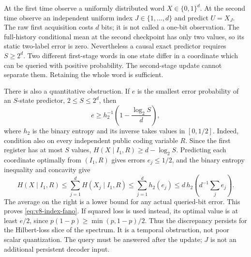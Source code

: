 \begin{example}\label{ex:v8-index}
At the first time observe a uniformly distributed word
$X\in\{0,1\}^d$. At the second time observe an independent uniform index
$J\in\{1,\ldots,d\}$ and predict $U=X_J$. The raw first acquisition costs
$d$ bits; it is not called a one-bit observation. The full-history
conditional mean at the second checkpoint has only two values, so its
static two-label error is zero. Nevertheless a causal exact predictor
requires $S\ge2^d$. Two different first-stage words in one state differ
in a coordinate which can be queried with positive probability. The
second-stage update cannot separate them. Retaining the whole word is
sufficient.

There is also a quantitative obstruction. If $e$ is the smallest error
probability of an $S$-state predictor, $2\le S\le2^d$, then
\begin{equation}
 e\ge h_2^{-1}\!\left(1-\frac{\log_2 S}{d}\right),     \label{eq:v8-index-fano}
\end{equation}
where $h_2$ is the binary entropy and its inverse takes values in
$[0,1/2]$. Indeed, condition also on every independent public coding
variable $R$. Since the first register has at most $S$ values,
$H(X\mid I_1,R)\ge d-\log_2 S$. Predicting each coordinate optimally
from $(I_1,R)$ gives errors $e_j\le1/2$, and the binary entropy inequality
and concavity give
\[
 H(X\mid I_1,R)\le\sum_{j=1}^d H(X_j\mid I_1,R)
             \le\sum_{j=1}^d h_2(e_j)
             \le d\,h_2\!\left(d^{-1}\sum_j e_j\right).
\]
The average on the right is a lower bound for any actual queried-bit
error. This proves \eqref{eq:v8-index-fano}. If squared loss is used
instead, its optimal value is at least $e/2$, since
$p(1-p)\ge\min(p,1-p)/2$. Thus the discrepancy persists for the
Hilbert-loss slice of the spectrum. It is a temporal obstruction, not
poor scalar quantization. The query must be answered after the update;
$J$ is not an additional persistent decoder input.
\end{example}
